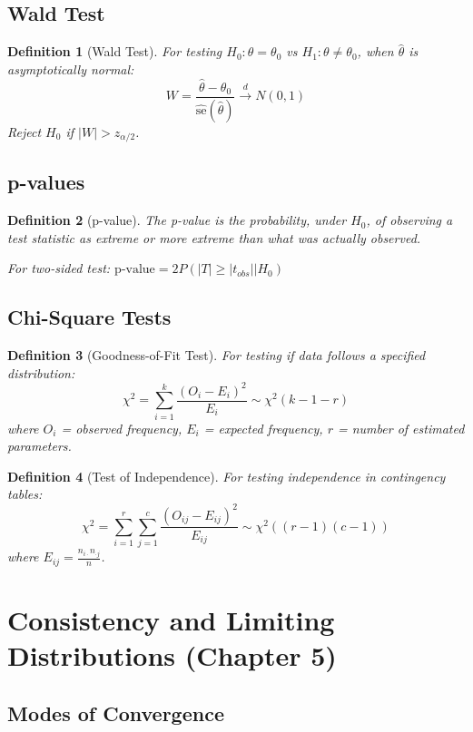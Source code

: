 \documentclass[12pt,a4paper]{amsart}
\newtheorem{definition}{Definition}[section]
\theoremstyle{remark}
\begin{document}
\subsection{Wald Test}

\begin{definition}[Wald Test]
For testing $H_0: \theta = \theta_0$ vs $H_1: \theta \neq \theta_0$, when $\hat{\theta}$ is asymptotically normal:
$$W = \frac{\hat{\theta} - \theta_0}{\widehat{\text{se}}(\hat{\theta})} \stackrel{d}{\to} N(0,1)$$
Reject $H_0$ if $|W| > z_{\alpha/2}$.
\end{definition}

\subsection{p-values}

\begin{definition}[p-value]
The p-value is the probability, under $H_0$, of observing a test statistic as extreme or more extreme than what was actually observed.

For two-sided test: $\text{p-value} = 2P(|T| \geq |t_{obs}| | H_0)$
\end{definition}

\subsection{Chi-Square Tests}

\begin{definition}[Goodness-of-Fit Test]
For testing if data follows a specified distribution:
$$\chi^2 = \sum_{i=1}^k \frac{(O_i - E_i)^2}{E_i} \sim \chi^2(k-1-r)$$
where $O_i$ = observed frequency, $E_i$ = expected frequency, $r$ = number of estimated parameters.
\end{definition}

\begin{definition}[Test of Independence]
For testing independence in contingency tables:
$$\chi^2 = \sum_{i=1}^r \sum_{j=1}^c \frac{(O_{ij} - E_{ij})^2}{E_{ij}} \sim \chi^2((r-1)(c-1))$$
where $E_{ij} = \frac{n_{i\cdot} n_{\cdot j}}{n}$.
\end{definition}

\section{Consistency and Limiting Distributions (Chapter 5)}

\subsection{Modes of Convergence}
\end{document}
